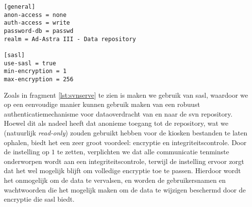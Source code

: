 \begin{lstlisting}[float, caption=Configuratie van een door svnserve-beheerde \acs{svn} repository., label=lst:svnserve]
[general]
anon-access = none
auth-access = write
password-db = passwd
realm = Ad-Astra III - Data repository

[sasl]
use-sasl = true
min-encryption = 1
max-encryption = 256
\end{lstlisting}

Zoals in fragment \ref{lst:svnserve} te zien is maken we gebruik van \ac{sasl}, waardoor we op een eenvoudige manier kunnen gebruik maken van een robuust authenticatiemechanisme voor dataoverdracht van en naar de \ac{svn} repository. Hoewel dit als nadeel heeft dat anonieme toegang tot de repository, wat we (natuurlijk \emph{read-only}) zouden gebruikt hebben voor de kiosken bestanden te laten ophalen, biedt het een zeer groot voordeel: encryptie en integriteitscontrole. Door de  instelling op $1$ te zetten, verplichten we dat alle communicatie tenminste onderworpen wordt aan een integriteitscontrole, terwijl de  instelling ervoor zorgt dat het wel mogelijk blijft om volledige encryptie toe te passen. Hierdoor wordt het onmogelijk om de data te vervalsen, en worden de gebruikersnamen en wachtwoorden die het mogelijk maken om de data te wijzigen beschermd door de encryptie die \ac{sasl} biedt.
